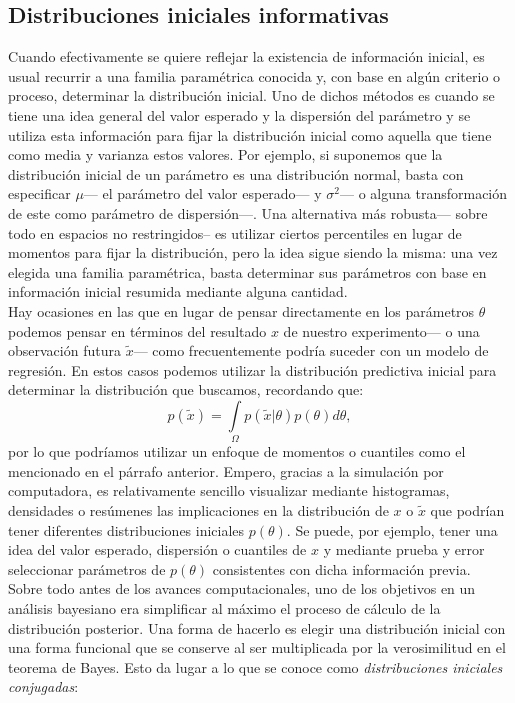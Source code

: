 \subsection*{Distribuciones iniciales informativas}

Cuando efectivamente se quiere reflejar la existencia de información inicial, es usual recurrir a una familia paramétrica conocida y, con base en algún criterio o proceso, determinar la distribución inicial. Uno de dichos métodos es cuando se tiene una idea general del valor esperado y la dispersión del parámetro y se utiliza esta información para fijar la distribución inicial como aquella que tiene como media y varianza estos valores. Por ejemplo, si suponemos que la distribución inicial de un parámetro es una distribución normal, basta con especificar $\mu$--- el parámetro del valor esperado--- y $\sigma^2$--- o alguna transformación de este como parámetro de dispersión---. Una alternativa más robusta--- sobre todo en espacios no restringidos-- es utilizar ciertos percentiles en lugar de momentos para fijar la distribución, pero la idea sigue siendo la misma: una vez elegida una familia paramétrica, basta determinar sus parámetros con base en información inicial resumida mediante alguna cantidad.\\

Hay ocasiones en las que en lugar de pensar directamente en los parámetros $\theta$ podemos pensar en términos del resultado $x$ de nuestro experimento--- o una observación futura $\tilde{x}$--- como frecuentemente podría suceder con un modelo de regresión. En estos casos podemos utilizar la distribución predictiva inicial para determinar la distribución que buscamos, recordando que: 
\begin{equation*}
p(\tilde{x}) = \int\limits_\Omega p(\tilde{x}|\theta)p(\theta)d\theta,
\end{equation*} 
por lo que podríamos utilizar un enfoque de momentos o cuantiles como el mencionado en el párrafo anterior. Empero, gracias a la simulación por computadora, es relativamente sencillo visualizar mediante histogramas, densidades o resúmenes las implicaciones en la distribución de $x$ o $\tilde{x}$ que podrían tener diferentes distribuciones iniciales $p(\theta)$. Se puede, por ejemplo, tener una idea del valor esperado, dispersión o cuantiles de $x$ y mediante prueba y error seleccionar parámetros de $p(\theta)$ consistentes con dicha información previa.\\

Sobre todo antes de los avances computacionales, uno de los objetivos en un análisis bayesiano era simplificar al máximo el proceso de cálculo de la distribución posterior. Una forma de hacerlo es elegir una distribución inicial con una forma funcional que se conserve al ser multiplicada por la verosimilitud en el teorema de Bayes. Esto da lugar a lo que se conoce como \textit{distribuciones iniciales conjugadas}: 

